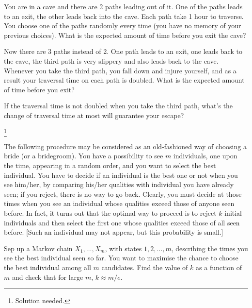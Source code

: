\begin{problem}
You are in a cave and there are 2 paths leading out of it. One of the paths leads to an exit, the other leads back into the cave. Each path take 1 hour to traverse. You choose one of the paths randomly every time (you have no memory of your previous choices). What is the expected amount of time before you exit the cave?

Now there are 3 paths instead of 2. One path leads to an exit, one leads back to the cave, the third path is very slippery and also leads back to the cave. Whenever you take the third path, you fall down and injure yourself, and as a result your traversal time on each path is doubled. What is the expected amount of time before you exit?

If the traversal time is not doubled when you take the third path, what's the change of traversal time at most will guarantee your escape?
\end{problem}

\begin{solution}[\bf Solution.]
\footnote{Solution needed.}
\end{solution}

\begin{problem}
The following procedure may be considered as an old-fashioned way of choosing a bride (or a bridegroom). You have a possibility to see $m$ individuals, one upon the time, appearing in a random
order, and you want to select the best individual. You have to decide if an individual is the best one or not when you see him/her, by comparing his/her qualities with individual you have already
seen; if you reject, there is no way to go back. Clearly, you must decide at those times when you see an individual whose qualities exceed those of anyone seen before. In fact, it turns out that the
optimal way to proceed is to reject $k$ initial individuals and then select the first one whose qualities exceed those of all seen before. [Such an individual may not appear, but this probability is
small.]

Sep up a Markov chain $X_1, \dots, X_m$, with states $1,2,\dots,m$, describing the times you see the best individual seen so far. You want to maximise the chance to choose the best individual among
all $m$ candidates. Find the value of $k$ as a function of $m$ and check that for large $m$, $k\approx m/e$.
\end{problem}

